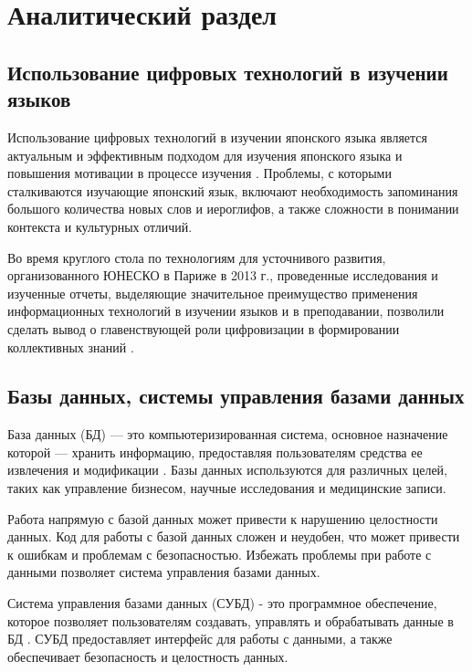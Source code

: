 \chapter{Аналитический раздел}

\section{Использование цифровых технологий в изучении языков}

Использование цифровых технологий в изучении японского языка 
является актуальным и эффективным подходом для изучения
японского языка и повышения мотивации в процессе
изучения \cite{digital-era}. Проблемы, с которыми сталкиваются
изучающие японский язык, включают необходимость запоминания большого количества новых
слов и иероглифов, а также сложности в понимании контекста
и культурных отличий.

Во время круглого стола по технологиям для усточнивого развития, организованного 
ЮНЕСКО в Париже в 2013 г.,
проведенные исследования и изученные отчеты, выделяющие значительное
преимущество применения информационных технологий в изучении языков
и в преподавании, позволили сделать вывод о главенствующей роли
цифровизации в формировании коллективных знаний \cite{japanese-comp}.

\section{Базы данных, системы управления базами данных}

База данных (БД) --- это компьютеризированная система, основное назначение
которой --- хранить информацию, предоставляя пользователям
средства ее извлечения и модификации \cite[46]{date}. Базы данных
используются для различных целей, таких как управление бизнесом,
научные исследования и медицинские записи.

Работа напрямую с базой данных может привести к нарушению целостности данных. 
Код для работы с базой данных сложен и неудобен, что может привести к ошибкам 
и проблемам с безопасностью. Избежать проблемы при работе с данными позволяет 
система управления базами данных.

Система управления базами данных (СУБД) - это программное
обеспечение, которое позволяет пользователям создавать,
управлять и обрабатывать данные в БД \cite[10--12]{pearson-subd}.
СУБД предоставляет интерфейс для работы с данными, а также обеспечивает
безопасность и целостность данных.


